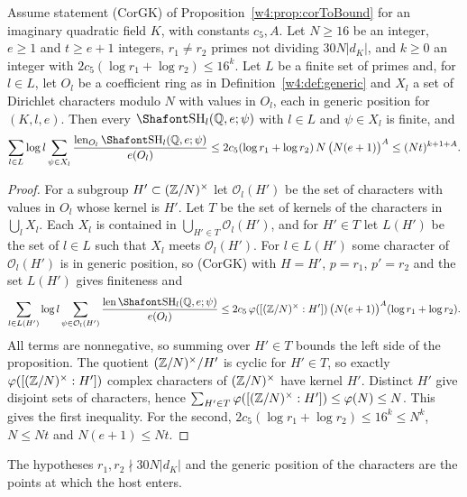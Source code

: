 \begin{proposition}\label{w4:prop:genericplus}
Assume statement (CorGK) of Proposition~\ref{w4:prop:corToBound} for an imaginary quadratic field $K$, with constants $c_5,A$. Let $N\ge16$ be an integer, $e\ge1$ and $t\ge e+1$ integers, $r_1\ne r_2$ primes not dividing $30N\lvert d_K\rvert$, and $k\ge0$ an integer with $2c_5(\log r_1+\log r_2)\le16^k$. Let $L$ be a finite set of primes and, for $l\in L$, let $O_l$ be a coefficient ring as in Definition~\ref{w4:def:generic} and $X_l$ a set of Dirichlet characters modulo $N$ with values in $O_l$, each in generic position for $(K,l,e)$. Then every $\Sha_l(\Q,e;\psi)$ with $l\in L$ and $\psi\in X_l$ is finite, and
\[
\sum_{l\in L}\log l\sum_{\psi\in X_l}\frac{\len_{O_l}\Sha_l(\Q,e;\psi)}{e(O_l)}\le2c_5(\log r_1+\log r_2)\,N\,\bigl(N(e+1)\bigr)^A\le(Nt)^{k+1+A}.
\]
\end{proposition}

\begin{proof}
For a subgroup $H'\subset(\mathbb Z/N)^\times$ let $\mathcal O_l(H')$ be the set of characters with values in $O_l$ whose kernel is $H'$. Let $T$ be the set of kernels of the characters in $\bigcup_lX_l$. Each $X_l$ is contained in $\bigcup_{H'\in T}\mathcal O_l(H')$, and for $H'\in T$ let $L(H')$ be the set of $l\in L$ such that $X_l$ meets $\mathcal O_l(H')$. For $l\in L(H')$ some character of $\mathcal O_l(H')$ is in generic position, so (CorGK) with $H=H'$, $p=r_1$, $p'=r_2$ and the set $L(H')$ gives finiteness and
\[
\sum_{l\in L(H')}\log l\sum_{\psi\in\mathcal O_l(H')}\frac{\len\Sha_l(\Q,e;\psi)}{e(O_l)}\le2c_5\,\varphi([(\Z/N)^\times:H'])\,\bigl(N(e+1)\bigr)^A(\log r_1+\log r_2).
\]
All terms are nonnegative, so summing over $H'\in T$ bounds the left side of the proposition. The quotient $(\mathbb Z/N)^\times/H'$ is cyclic for $H'\in T$, so exactly $\varphi([(\mathbb Z/N)^\times:H'])$ complex characters of $(\mathbb Z/N)^\times$ have kernel $H'$. Distinct $H'$ give disjoint sets of characters, hence $\sum_{H'\in T}\varphi([(\mathbb Z/N)^\times:H'])\le\varphi(N)\le N$. This gives the first inequality. For the second, $2c_5(\log r_1+\log r_2)\le16^k\le N^k$, $N\le Nt$ and $N(e+1)\le Nt$.
\end{proof}

The hypotheses $r_1,r_2\nmid30N\lvert d_K\rvert$ and the generic position of the characters are the points at which the host enters. 

